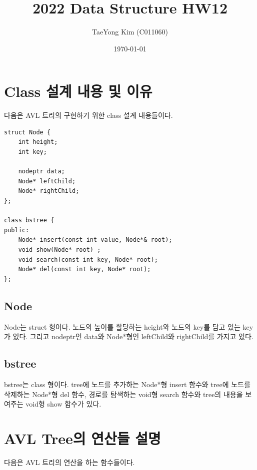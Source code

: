 \documentclass{article}
\title{2022 Data Structure HW12}
\author{TaeYong Kim (C011060)}
\date{\today}
\begin{document}
\maketitle

\section{Class 설계 내용 및 이유}

다음은 AVL 트리의 구현하기 위한 class 설계 내용들이다.

\begin{verbatim}
struct Node {
    int height;
    int key;

    nodeptr data;
    Node* leftChild;
    Node* rightChild;
};

class bstree {
public:
    Node* insert(const int value, Node*& root);
    void show(Node* root) ;
    void search(const int key, Node* root);
    Node* del(const int key, Node* root);
};
\end{verbatim}

\subsection{Node}
Node는 struct 형이다. 노드의 높이를 할당하는 height와 노드의 key를 담고 있는 key가 있다. 그리고 nodeptr인 data와 Node*형인 leftChild와 rightChild를 가지고 있다.

\subsection{bstree}
bstree는 class 형이다. tree에 노드를 추가하는 Node*형 insert 함수와 tree에 노드를 삭제하는 Node*형 del 함수, 경로를 탐색하는 void형 search 함수와 tree의 내용을 보여주는 void형 show 함수가 있다.

\section{AVL Tree의 연산들 설명}

다음은 AVL 트리의 연산을 하는 함수들이다.
\end{document}
